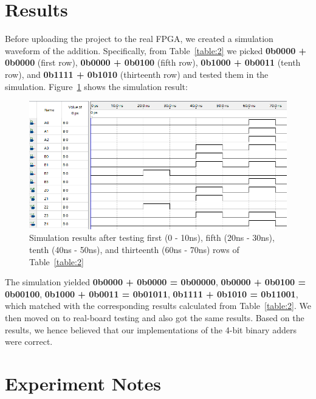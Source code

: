 \documentclass[12pt]{article}
\begin{document}
\section{Results}

Before uploading the project to the real FPGA, we created a simulation waveform of the addition. Specifically, from Table~\ref{table:2} we picked \textbf{0b0000 + 0b0000} (first row), \textbf{0b0000 + 0b0100} (fifth row), \textbf{0b1000 + 0b0011} (tenth row), and \textbf{0b1111 + 0b1010} (thirteenth row) and tested them in the simulation. Figure~\ref{figure:4} shows the simulation result:

\begin{figure}[h]
  \centering
  \includegraphics[width=\textwidth]{simulation.png}
  \caption{Simulation results after testing first (0 - 10ns), fifth (20ns - 30ns), tenth (40ns - 50ns), and thirteenth (60ns - 70ns) rows of Table~\ref{table:2}}
  \label{figure:4}
\end{figure}

The simulation yielded \textbf{0b0000 + 0b0000 = 0b00000}, \textbf{0b0000 + 0b0100 = 0b00100}, \textbf{0b1000 + 0b0011 = 0b01011}, \textbf{0b1111 + 0b1010 = 0b11001}, which matched with the corresponding results calculated from Table~\ref{table:2}. We then moved on to real-board testing and also got the same results. Based on the results, we hence believed that our implementations of the 4-bit binary adders were correct.

\section{Experiment Notes}
\end{document}
